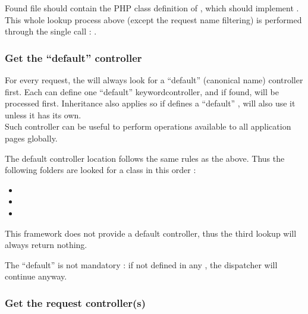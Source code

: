 \documentclass[pdftex,12pt,a4paper]{article}
\begin{document}
Found file should contain the PHP class definition of , which should implement .\\
This whole lookup process above (except the request name filtering) is performed through the single call : .

\subsubsection{Get the ``default'' controller} \label{sec:get-the-default-controller}

For every request, the  will always look for a ``default'' (canonical name) controller first. Each  can define one ``default'' keyword{controller}, and if found, will be processed first. Inheritance also applies so if   defines a ``default'' ,  will also use it unless it has its own.\\
Such controller can be useful to perform operations available to all application pages globally.

The default controller location follows the same rules as the above. Thus the following folders are looked for a  class in this order :
\begin{itemize}
	\item {}
	\item {}
	\item {}
\end{itemize}
\begin{note}
	This framework does not provide a default controller, thus the third lookup will always return nothing.
\end{note}

The ``default''  is not mandatory : if not defined in any , the dispatcher will continue anyway.

\subsubsection{Get the request controller(s)} \label{sec:get-the-request-controller}
\end{document}
